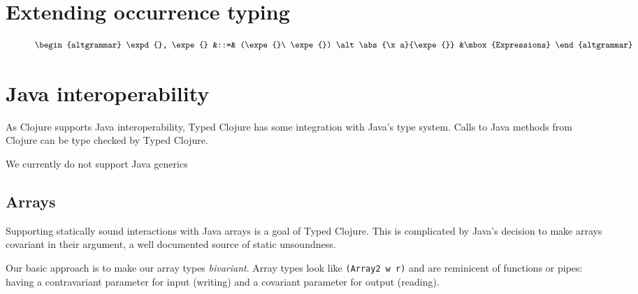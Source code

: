 \documentclass{sigplanconf}
\begin{document}
\section{Extending occurrence typing}

\begin{figure*}
$$
\begin{altgrammar}
  \expd{}, \expe{} &::=& (\expe{}\ \expe{}) \alt \abs{\x a}{\expe{}}
                &\mbox{Expressions}
\end{altgrammar}
$$
\end{figure*}


\section{Java interoperability}

As Clojure supports Java interoperability, Typed Clojure has some
integration with Java's type system. Calls to Java methods from
Clojure can be type checked by Typed Clojure.

We currently do not support Java generics

\subsection{Arrays}

Supporting statically sound interactions with Java arrays is a goal
of Typed Clojure. This is complicated by Java's decision to make
arrays covariant in their argument, a well documented source of static
unsoundness.

Our basic approach is to make our array types \emph{bivariant}. Array types
look like \lstinline|(Array2 w r)| and
are reminicent of functions or pipes: having a contravariant parameter for input (writing)
and a covariant parameter for output (reading).
\end{document}

